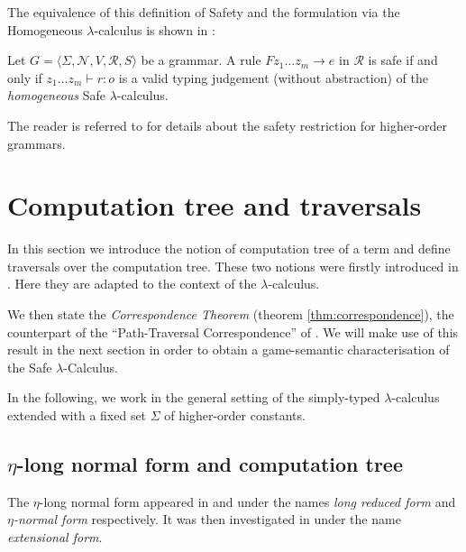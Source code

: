 \documentclass{llncs}
\begin{document}
The equivalence of this definition of Safety and the formulation via the Homogeneous $\lambda$-calculus is shown in \cite{demirandathesis}:
\begin{proposition} Let $G = \langle \Sigma, \mathcal{N}, V, \mathcal{R}, S \rangle$ be a grammar.
A rule $F z_1 \ldots z_m \rightarrow e$ in $\mathcal{R}$ is safe if and only if
$ z_1 \ldots z_m \vdash r : o$
is a valid typing judgement (without abstraction) of the \emph{homogeneous} Safe $\lambda$-calculus.
\end{proposition}


The reader is referred to \cite{KNU02,demirandathesis,safety-mirlong2004}
for details about the safety restriction for higher-order grammars.









\section{Computation tree and traversals}
\label{sec:correspondence}

In this section we introduce the notion of computation tree of a term and
define traversals over the computation tree. These two notions were firstly introduced in \cite{OngLics2006}. Here they
are adapted to the context of the $\lambda$-calculus.

We then state the \emph{Correspondence Theorem} (theorem \ref{thm:correspondence}), the counterpart of the ``Path-Traversal Correspondence''
of \cite{OngLics2006}. We will make use of this result in the next section in order to obtain
a game-semantic characterisation of the Safe $\lambda$-Calculus.

In the following, we work in the general setting of the simply-typed
$\lambda$-calculus extended with a fixed set $\Sigma$ of
higher-order constants.


\subsection{$\eta$-long normal form and computation tree}


The $\eta$-long normal form appeared in
\cite{DBLP:journals/tcs/JensenP76} and
\cite{DBLP:journals/tcs/Huet75} under the names \emph{long reduced
form} and \emph{$\eta$-normal form} respectively. It was then
investigated in \cite{huet76} under the name \emph{extensional
form}.
\end{document}
